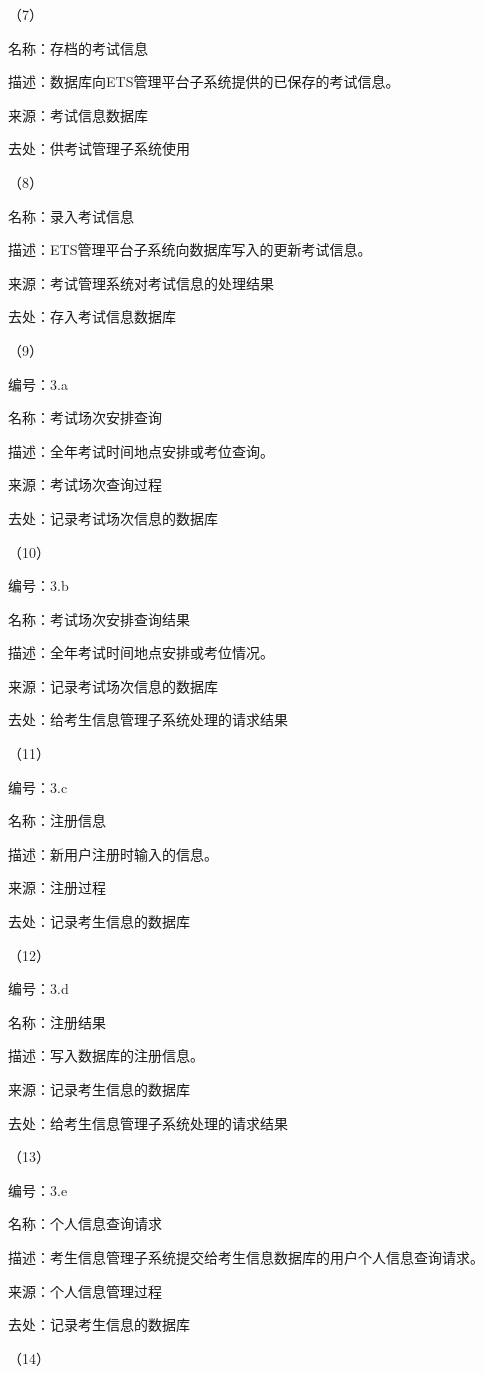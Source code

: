 （7）

名称：存档的考试信息

描述：数据库向ETS管理平台子系统提供的已保存的考试信息。

来源：考试信息数据库

去处：供考试管理子系统使用

（8）

名称：录入考试信息

描述：ETS管理平台子系统向数据库写入的更新考试信息。

来源：考试管理系统对考试信息的处理结果

去处：存入考试信息数据库

（9）

编号：3.a

名称：考试场次安排查询

描述：全年考试时间地点安排或考位查询。

来源：考试场次查询过程

去处：记录考试场次信息的数据库

（10）

编号：3.b

名称：考试场次安排查询结果

描述：全年考试时间地点安排或考位情况。

来源：记录考试场次信息的数据库

去处：给考生信息管理子系统处理的请求结果

（11）

编号：3.c

名称：注册信息

描述：新用户注册时输入的信息。

来源：注册过程

去处：记录考生信息的数据库

（12）

编号：3.d

名称：注册结果

描述：写入数据库的注册信息。

来源：记录考生信息的数据库

去处：给考生信息管理子系统处理的请求结果

（13）

编号：3.e

名称：个人信息查询请求

描述：考生信息管理子系统提交给考生信息数据库的用户个人信息查询请求。

来源：个人信息管理过程

去处：记录考生信息的数据库

（14）

